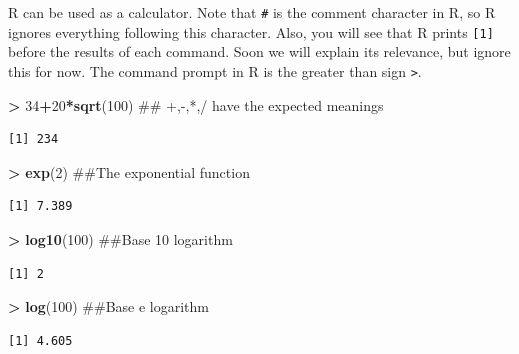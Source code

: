 \documentclass[]{krantz}
\makeatletter
\newenvironment{Shaded}{\begin{snugshade}}{\end{snugshade}}
\newcommand{\KeywordTok}[1]{\textcolor[rgb]{0.27,0.27,0.27}{\textbf{#1}}}
\newcommand{\DecValTok}[1]{\textcolor[rgb]{0.06,0.06,0.06}{#1}}
\newcommand{\StringTok}[1]{\textcolor[rgb]{0.5,0.5,0.5}{#1}}
\newcommand{\OperatorTok}[1]{\textcolor[rgb]{0.43,0.43,0.43}{\textbf{#1}}}
\newcommand{\NormalTok}[1]{#1}
\newenvironment{kframe}{%
\medskip{}
\setlength{\fboxsep}{.8em}
 \def\at@end@of@kframe{}%
 \ifinner\ifhmode%
  \def\at@end@of@kframe{\end{minipage}}%
  \begin{minipage}{\columnwidth}%
 \fi\fi%
 \def\FrameCommand##1{\hskip\@totalleftmargin \hskip-\fboxsep
 \colorbox{shadecolor}{##1}\hskip-\fboxsep
     \hskip-\linewidth \hskip-\@totalleftmargin \hskip\columnwidth}%
 \MakeFramed {\advance\hsize-\width
   \@totalleftmargin\z@ \linewidth\hsize
   \@setminipage}}%
 {\par\unskip\endMakeFramed%
 \at@end@of@kframe}
\renewenvironment{Shaded}{\begin{kframe}}{\end{kframe}}
\makeatother
\begin{document}
R can be used as a calculator. Note that \texttt{\#} is the comment
character in R, so R ignores everything following this character. Also,
you will see that R prints \texttt{{[}1{]}} before the results of each
command. Soon we will explain its relevance, but ignore this for now.
The command prompt in R is the greater than sign
\texttt{\textgreater{}}.

\begin{Shaded}
\begin{Highlighting}[]
\OperatorTok{>}\StringTok{ }\DecValTok{34}\OperatorTok{+}\DecValTok{20}\OperatorTok{*}\KeywordTok{sqrt}\NormalTok{(}\DecValTok{100}\NormalTok{)  ## +,-,*,/ have the expected meanings}
\end{Highlighting}
\end{Shaded}

\begin{verbatim}
[1] 234
\end{verbatim}

\begin{Shaded}
\begin{Highlighting}[]
\OperatorTok{>}\StringTok{ }\KeywordTok{exp}\NormalTok{(}\DecValTok{2}\NormalTok{)  ##The exponential function}
\end{Highlighting}
\end{Shaded}

\begin{verbatim}
[1] 7.389
\end{verbatim}

\begin{Shaded}
\begin{Highlighting}[]
\OperatorTok{>}\StringTok{ }\KeywordTok{log10}\NormalTok{(}\DecValTok{100}\NormalTok{)  ##Base 10 logarithm}
\end{Highlighting}
\end{Shaded}

\begin{verbatim}
[1] 2
\end{verbatim}

\begin{Shaded}
\begin{Highlighting}[]
\OperatorTok{>}\StringTok{ }\KeywordTok{log}\NormalTok{(}\DecValTok{100}\NormalTok{)  ##Base e logarithm}
\end{Highlighting}
\end{Shaded}

\begin{verbatim}
[1] 4.605
\end{verbatim}
\end{document}
